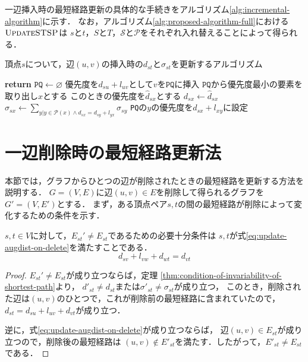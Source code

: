一辺挿入時の最短経路更新の具体的な手続きをアルゴリズム\ref{alg:incremental-algorithm}に示す．
なお，アルゴリズム\ref{alg:proposed-algorithm-full}における$\textproc{UpdateSTSP}$は
$s$と$t$，$S$と$T$，$\mathcal{S}$と$\mathcal{P}$をそれぞれ入れ替えることによって得られる．

\begin{algorithm}[tb]
  \caption{頂点$s$について，辺$(u,v)$の挿入時の$d_{st}$と$\sigma_{st}$を更新するアルゴリズム}
  \label{alg:incremental-algorithm}
  \begin{algorithmic}[1]\small
    \State \textbf{return}
    \EndIf
    \State $\texttt{PQ}\gets\varnothing$
    \State 優先度を$d_{su}+l_{uv}$として$v$を$\texttt{PQ}$に挿入
    \State $\texttt{PQ}$から優先度最小の要素を取り出し$x$とする
    \State このときの優先度を$\hat{d}_{sx}$とする
    \State $d_{sx}\gets\hat{d}_{sx}$
    \State $\sigma_{sx}\gets\sum_{y|y\in\mathcal{P}(x)\land d_{sx}=d_{sy}+l_{yx}}\sigma_{sy}$
    \State \texttt{PQ}の$y$の優先度を$d_{sx}+l_{xy}$に設定
    \EndIf
    \EndFor
    \EndWhile
    \EndProcedure
  \end{algorithmic}
\end{algorithm}

\section{一辺削除時の最短経路更新法}
\label{sect:update-apsp-on-delete}
本節では，グラフからひとつの辺が削除されたときの最短経路を更新する方法を説明する．
$G=(V,E)$に辺$(u,v)\in E$を削除して得られるグラフを$G'=(V,E')$とする．
まず，ある頂点ペア$s,t$の間の最短経路が削除によって変化するための条件を示す．

\begin{lemma}
  \label{lmm:update-augdist-on-delete}
  $s,t\in V$に対して，$E_{st}'\neq E_{st}$であるための必要十分条件は
  $s,t$が式\eqref{eq:update-augdist-on-delete}を満たすことである．
  \begin{equation}
    d_{sv}+l_{vw}+d_{wt}=d_{vt}
    \label{eq:update-augdist-on-delete}
  \end{equation}
\end{lemma}
\begin{proof}
  $E_{st}'\neq E_{st}$が成り立つならば，定理
  \ref{thm:condition-of-invariability-of-shortest-path}より，
  $d'_{st}\neq d_{st}$または$\sigma'_{st}\neq\sigma_{st}$が成り立つ，
  このとき，削除された辺は$(u,v)$のひとつで，これが削除前の最短経路に含まれていたので，
  $d_{st}=d_{su}+l_{uv}+d_{vt}$が成り立つ．

  逆に，式\eqref{eq:update-augdist-on-delete}が成り立つならば，
  辺$(u,v)\in E_{st}$が成り立つので，削除後の最短経路は
  $(u,v)\notin E'_{st}$を満たす．したがって，$E'_{st}\neq E_{st}$である．
\end{proof}

